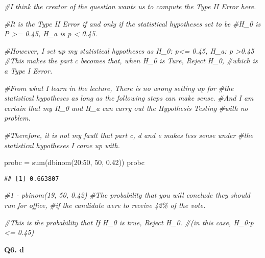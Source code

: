 \documentclass[
]{article}
\newenvironment{Shaded}{\begin{snugshade}}{\end{snugshade}}
\newcommand{\CommentTok}[1]{\textcolor[rgb]{0.56,0.35,0.01}{\textit{#1}}}
\newcommand{\DecValTok}[1]{\textcolor[rgb]{0.00,0.00,0.81}{#1}}
\newcommand{\FloatTok}[1]{\textcolor[rgb]{0.00,0.00,0.81}{#1}}
\newcommand{\FunctionTok}[1]{\textcolor[rgb]{0.00,0.00,0.00}{#1}}
\newcommand{\NormalTok}[1]{#1}
\newcommand{\OtherTok}[1]{\textcolor[rgb]{0.56,0.35,0.01}{#1}}
\newcommand{\SpecialCharTok}[1]{\textcolor[rgb]{0.00,0.00,0.00}{#1}}
\begin{document}
\begin{Shaded}
\begin{Highlighting}[]
\CommentTok{\#I think the creator of the question wants us to compute the Type II Error here.}

\CommentTok{\#It is the Type II Error if and only if the statistical hypotheses set to be}
\CommentTok{\#H\_0 is P \textgreater{}= 0.45, H\_a is p \textless{} 0.45.}

\CommentTok{\#However, I set up my statistical hypotheses as H\_0: p\textless{}= 0.45, H\_a: p \textgreater{}0.45}
\CommentTok{\#This makes the part c becomes that, when H\_0 is Ture, Reject H\_0, }
\CommentTok{\#which is a Type I Error. }

\CommentTok{\#From what I learn in the lecture, There is no wrong setting up for }
\CommentTok{\#the statistical hypotheses as long as the following steps can make sense.}
\CommentTok{\#And I am certain that my H\_0 and H\_a can carry out the Hypothesis Testing}
\CommentTok{\#with no problem.}

\CommentTok{\#Therefore, it is not my fault that part c, d and e makes less sense under }
\CommentTok{\#the statistical hypotheses I came up with.}

\NormalTok{probc }\OtherTok{=} \FunctionTok{sum}\NormalTok{(}\FunctionTok{dbinom}\NormalTok{(}\DecValTok{20}\SpecialCharTok{:}\DecValTok{50}\NormalTok{, }\DecValTok{50}\NormalTok{, }\FloatTok{0.42}\NormalTok{))}
\NormalTok{probc }
\end{Highlighting}
\end{Shaded}

\begin{verbatim}
## [1] 0.663807
\end{verbatim}

\begin{Shaded}
\begin{Highlighting}[]
\CommentTok{\#1 {-} pbinom(19, 50, 0.42)}
\CommentTok{\#The probability that you will conclude they should run for office,}
\CommentTok{\#if the candidate were to receive 42\% of the vote.}

\CommentTok{\#This is the probability that If H\_0 is true, Reject H\_0.}
\CommentTok{\#(in this case, H\_0:p \textless{}= 0.45)}
\end{Highlighting}
\end{Shaded}

\textbf{Q6. d}
\end{document}
